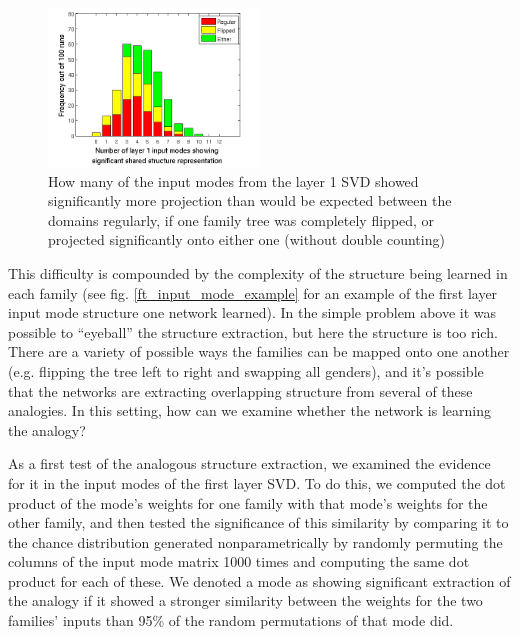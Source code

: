 \documentclass[10pt,letterpaper]{article}
\begin{document}
\vspace{-2em}
\begin{figure}[H]
\centering
\includegraphics[width=0.5\textwidth]{figures/ft_input_mode_significance_hist.png}
\caption{How many of the input modes from the layer 1 SVD showed significantly more projection than would be expected between the domains regularly, if one family tree was completely flipped, or projected significantly onto either one (without double counting)}
\label{ft_input_mode_sig_hist}
\end{figure}
This difficulty is compounded by the complexity of the structure being learned in each family (see fig. \ref{ft_input_mode_example} for an example of the first layer input mode structure one network learned). In the simple problem above it was possible to ``eyeball'' the structure extraction, but here the structure is too rich. There are a variety of possible ways the families can be mapped onto one another (e.g. flipping the tree left to right and swapping all genders), and it's possible that the networks are extracting overlapping structure from several of these analogies. In this setting, how can we examine whether the network is learning the analogy? \par
As a first test of the analogous structure extraction, we examined the evidence for it in the input modes of the first layer SVD. To do this, we computed the dot product of the mode's weights for one family with that mode's weights for the other family, and then tested the significance of this similarity by comparing it to the chance distribution generated nonparametrically by randomly permuting the columns of the input mode matrix 1000 times and computing the same dot product for each of these. We denoted a mode as showing significant extraction of the analogy if it showed a stronger similarity between the weights for the two families' inputs than 95\% of the random permutations of that mode did. \par
\end{document}
